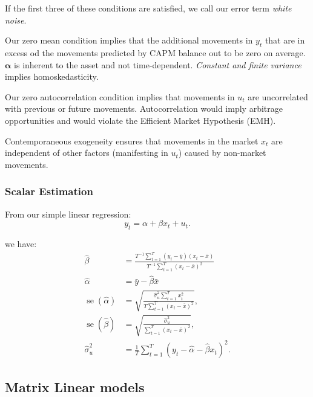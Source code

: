 \documentclass[11pt]{article}
\begin{document}
If the first three of these conditions are satisfied, we call our error term \textit{white noise}.

Our zero mean condition implies that the additional movements in $y_t$ that are in excess od the movements predicted by CAPM balance out to be zero on average. $\boldsymbol{\alpha}$ is inherent to the asset and not time-dependent. \textit{Constant and finite variance} implies homoskedasticity.

Our zero autocorrelation condition implies that movements in $u_t$ are uncorrelated with previous or future movements. Autocorrelation would imply arbitrage opportunities and would violate the Efficient Market Hypothesis (EMH).

Contemporaneous exogeneity ensures that movements in the market $x_t$ are independent of other factors (manifesting in $u_t$) caused by non-market movements.

\begin{shaded}
\subsubsection{Scalar Estimation}

From our simple linear regression:
\begin{equation}
y_t=\alpha+\beta x_t+u_t .
\end{equation}

we have:
\begin{equation}
\begin{aligned}
 \widehat{\beta}&=\frac{T^{-1} \sum_{t=1}^T\left(y_t-\bar{y}\right)\left(x_t-\bar{x}\right)}{T^{-1} \sum_{t=1}^T\left(x_t-\bar{x}\right)^2} \\
 \widehat{\alpha}&=\bar{y}-\widehat{\beta} \bar{x} \\
 \operatorname{se}(\widehat{\alpha})&=\sqrt{\frac{\widehat{\sigma}_u^2 \sum_{t=1}^T x_t^2}{T \sum_{t=1}^T\left(x_t-\bar{x}\right)^2}}, \\
 \operatorname{se}(\widehat{\beta})&=\sqrt{\frac{\widehat{\sigma}_u^2}{\sum_{t=1}^T\left(x_t-\bar{x}\right)^2}}, \\
 \widehat{\sigma}_u^2&=\frac{1}{T} \sum_{t=1}^T\left(y_t-\widehat{\alpha}-\widehat{\beta} x_t\right)^2 .
\end{aligned}
\end{equation}
\end{shaded}

\subsection{Matrix Linear models}
\end{document}
